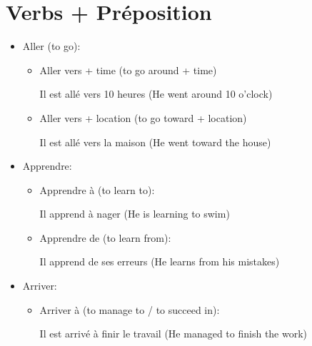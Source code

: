 \documentclass{book}
\begin{document}
    \section{Verbs + Préposition}
        \begin{itemize}
            \item Aller (to go):
                \begin{itemize}
                    \item Aller vers + time (to go around + time)
                        \begin{center}
                            Il est allé vers 10 heures (He went around 10 o'clock)
                        \end{center}

                    \item Aller vers + location (to go toward + location)
                        \begin{center}
                            Il est allé vers la maison (He went toward the house)
                        \end{center}
                \end{itemize}
            
            \item Apprendre:
                \begin{itemize}
                    \item Apprendre à (to learn to):
                        \begin{center}
                            Il apprend à nager (He is learning to swim)
                        \end{center}
                    
                    \item Apprendre de (to learn from):
                        \begin{center}
                            Il apprend de ses erreurs (He learns from his mistakes)
                        \end{center}
                \end{itemize}
            
            \item Arriver:
                \begin{itemize}
                    \item Arriver à (to manage to / to succeed in):
                        \begin{center}
                            Il est arrivé à finir le travail (He managed to finish the work)
                        \end{center}
                    

\end{itemize}
\end{itemize}
\end{document}
